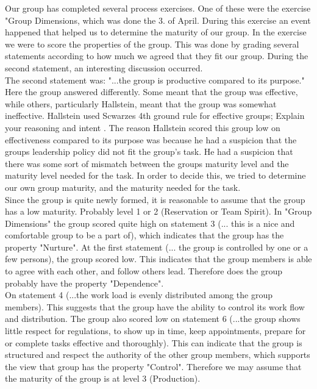 Our group has completed several process exercises. One of these were the exercise "Group Dimensions, which was done the 3. of April. During this exercise an event happened that helped us to determine the  maturity of our group. In the exercise we were to score 
the properties of the group. This was done by grading several statements according to how much we agreed that they fit our group. During the second statement, an interesting discussion occurred.  
\\

The second statement was: "...the group is productive compared to its purpose." Here the group answered differently. Some meant that the group was effective, while others, particularly Hallstein, meant that the group was somewhat ineffective. Hallstein used Scwarzes 4th ground rule for effective groups; Explain your reasoning and intent \cite{EffectiveGroups}. The reason Hallstein scored this group low on effectiveness compared to its purpose was because he had a suspicion that the groups leadership policy did not fit the group's task. He had a suspicion that there was some sort of mismatch between the groups maturity level and the maturity level needed for the task. In order to decide this, we tried to determine our own group maturity, and the maturity needed for the task.  
\\
Since the group is quite newly formed, it is reasonable to assume that the group has a low maturity. Probably level 1 or 2 (Reservation or Team Spirit). In "Group Dimensions" the group scored quite high on statement 3 (... this is a nice and comfortable group to be a part of), which indicates that the group has the property "Nurture". At the first statement (... the group is controlled by one or a few persons), the group scored low. This indicates that the group members is able to agree with each other, and follow others lead. Therefore does the group probably have the property "Dependence".\cite{Maturity} 
\\
On statement 4 (...the work load is evenly distributed among the group members). This suggests that the group have the ability to control its work flow and distribution. The group also scored low on statement 6 (...the group shows little respect for regulations, to show up in time, keep appointments, prepare for or complete tasks effective and thoroughly). This can indicate that the group is structured and respect the authority of the other group members, which supports the view that group has the property "Control". Therefore we may assume that the maturity of the group is at level 3 (Production).\cite{Maturity} 
